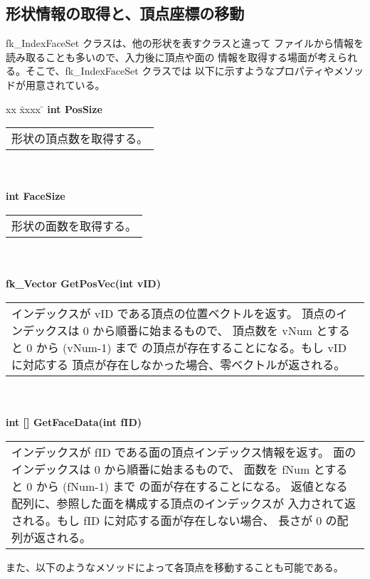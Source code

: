 \subsection{形状情報の取得と、頂点座標の移動}
fk\_IndexFaceSet クラスは、他の形状を表すクラスと違って
ファイルから情報を読み取ることも多いので、入力後に頂点や面の
情報を取得する場面が考えられる。そこで、fk\_IndexFaceSet クラスでは
以下に示すようなプロパティやメソッドが用意されている。
\begin{tabbing}
xx \= xxxx \= \kill
\> \textbf{int PosSize} \\
	\> \> \begin{tabular}{p{15cm}}
		形状の頂点数を取得する。
	\end{tabular} \\ \\

\> \textbf{int FaceSize} \\
	\> \> \begin{tabular}{p{15cm}}
		形状の面数を取得する。
	\end{tabular} \\ \\

\> \textbf{fk\_Vector GetPosVec(int vID)} \\
	\> \> \begin{tabular}{p{15cm}}
		インデックスが vID である頂点の位置ベクトルを返す。
		頂点のインデックスは 0 から順番に始まるもので、
		頂点数を vNum とすると 0 から (vNum-1) まで
		の頂点が存在することになる。もし vID に対応する
		頂点が存在しなかった場合、零ベクトルが返される。
	\end{tabular} \\ \\

\> \textbf{int [] GetFaceData(int fID)} \\
	\> \> \begin{tabular}{p{15cm}}
		インデックスが fID である面の頂点インデックス情報を返す。
		面のインデックスは 0 から順番に始まるもので、
		面数を fNum とすると 0 から (fNum-1) まで
		の面が存在することになる。
		返値となる配列に、参照した面を構成する頂点のインデックスが
		入力されて返される。もし fID に対応する面が存在しない場合、
		長さが 0 の配列が返される。
	\end{tabular}
\end{tabbing}
また、以下のようなメソッドによって各頂点を移動することも可能である。
